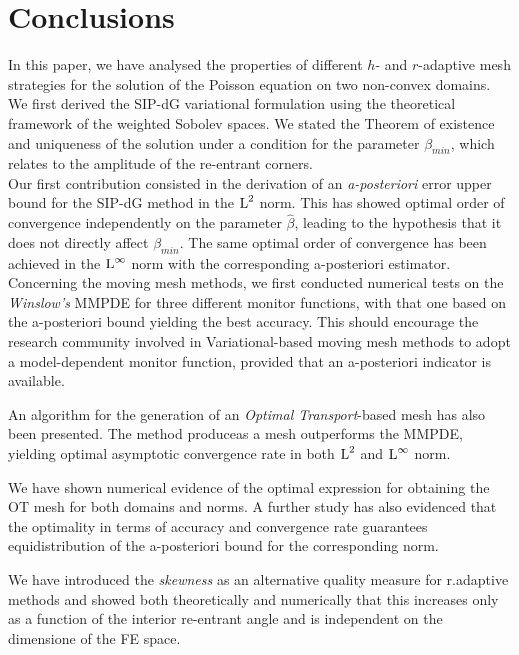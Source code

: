 \documentclass[a4paper,11pt]{article}
\begin{document}
{\clearpage
\newpage

\section{Conclusions}
\label{sec:Conclusion}

In this paper, we have analysed the properties of different $h$- and $r$-adaptive mesh strategies for the solution of the Poisson equation on two non-convex domains. We first derived the SIP-dG variational formulation using the theoretical framework of the weighted Sobolev spaces. We stated the Theorem of existence and uniqueness of the solution under a condition for the parameter $\beta_{min}$, which relates to the amplitude of the re-entrant corners.\\

Our first contribution consisted in the derivation of an \textit{a-posteriori} error upper bound for the SIP-dG method in the $\operatorname L^{2}$ norm. This has showed optimal order of convergence independently on the parameter $\hat{\beta}$, leading to the hypothesis that it  does not directly affect $\beta_{min}$. The same optimal order of convergence has been achieved in the $\operatorname L^{\infty}$ norm with the corresponding a-posteriori estimator.\\

Concerning the moving mesh methods, we first conducted numerical tests on the \textit{Winslow's} MMPDE for three different monitor functions, with that one based on the a-posteriori bound yielding the best accuracy. This should encourage the research community involved in Variational-based moving mesh methods to adopt a model-dependent monitor function, provided that an a-posteriori indicator is available.

An algorithm for the generation of an \textit{Optimal Transport}-based mesh has also been presented. The method produceas a mesh outperforms the  MMPDE, yielding optimal asymptotic convergence rate in both $\operatorname L^{2}$ and $\operatorname L^{\infty}$ norm.

We have shown numerical evidence of the optimal expression for obtaining the OT mesh for both domains and norms. A further study has also evidenced that the optimality in terms of accuracy and convergence rate guarantees equidistribution of the a-posteriori bound for the corresponding norm.

We have introduced the \textit{skewness} as an alternative quality measure for r.adaptive methods and showed both theoretically and numerically that this increases only as a function of the interior re-entrant angle and is independent on the dimensione of the FE space.\\ 

}
\end{document}
